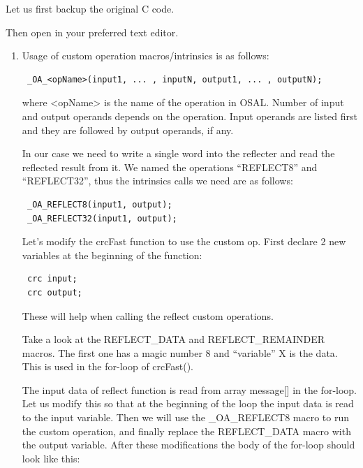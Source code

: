 \documentclass[a4paper,twoside]{tceusermanual}
\begin{document}
Let us first backup the original C code.


Then open  in your preferred text editor.

\begin{enumerate}
\item

Usage of custom operation macros/intrinsics is as follows:

\begin{verbatim}
 _OA_<opName>(input1, ... , inputN, output1, ... , outputN);
\end{verbatim}

where <opName> is the name of the operation in OSAL. Number of input and
output operands depends on the operation. Input operands are listed first
and they are followed by output operands, if any.

In our case we need to write a single word into the reflecter and read the
reflected result from it. We named the operations ``REFLECT8'' and ``REFLECT32'',
thus the intrinsics calls we need are as follows:

\begin{verbatim}
 _OA_REFLECT8(input1, output);
 _OA_REFLECT32(input1, output);
\end{verbatim}

Let's modify the crcFast function to use the custom op. First declare 2 new
variables at the beginning of the function:

\begin{verbatim}
 crc input;
 crc output;
\end{verbatim}

These will help when calling the reflect custom operations.

Take a look at the REFLECT\_DATA and REFLECT\_REMAINDER macros. The first one
has a magic number 8 and ``variable'' X is the data. This is used in the
for-loop of crcFast().

The input data of reflect function is read from array message[] in the for-loop.
Let us modify this so that at the beginning of the loop the input data is
read to the input variable. Then we will use the \_OA\_REFLECT8 macro to run
the custom operation, and finally replace the REFLECT\_DATA macro with the
output variable. After these modifications the body of the for-loop should
look like this:


\end{enumerate}
\end{document}
